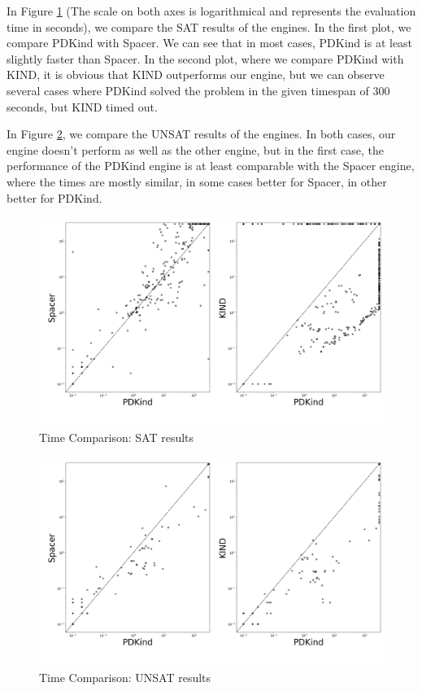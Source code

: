 In Figure \ref{fig:sat_indet_comparison} (The scale on both axes is logarithmical and represents the evaluation time in seconds), we compare the SAT results of the engines. In the first plot, we compare PDKind with Spacer. We can see that in most cases, PDKind is at least slightly faster than Spacer. In the second plot, where we compare PDKind with KIND, it is obvious that KIND outperforms our engine, but we can observe several cases where PDKind solved the problem in the given timespan of 300 seconds, but KIND timed out.

In Figure \ref{fig:unsat_indet_comparison}, we compare the UNSAT results of the engines. In both cases, our engine doesn't perform as well as the other engine, but in the first case, the performance of the PDKind engine is at least comparable with the Spacer engine, where the times are mostly similar, in some cases better for Spacer, in other better for PDKind.

\renewcommand{\figurename}{Figure}
\begin{figure}[h!]
    \centering
    \includegraphics[width=\textwidth]{img/golem_sat_scatter.png}
    \caption{Time Comparison: SAT results}
    \label{fig:sat_indet_comparison}
\end{figure}

\begin{figure}[h!]
    \centering
    \includegraphics[width=\textwidth]{img/golem_unsat_scatter.png}
    \caption{Time Comparison: UNSAT results}
    \label{fig:unsat_indet_comparison}
\end{figure}
